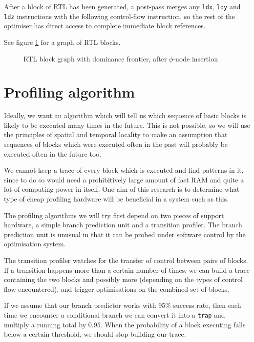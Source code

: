 After a block of RTL has been generated, a post-pass merges any \texttt{ldx}, \texttt{ldy} and \texttt{ldz} instructions with the following control-flow instruction, so the rest of the optimiser has direct access to complete immediate block references.

See figure \ref{rtl} for a graph of RTL blocks.

\begin{figure}[tmb]
\centerline{}
\caption{\label{rtl}RTL block graph with dominance frontier, after $\phi$-node insertion}
\end{figure}

\section{Profiling algorithm}

Ideally, we want an algorithm which will tell us which sequence of basic blocks is likely to be executed many times in the future. This is not possible, so we will use the principles of spatial and temporal locality to make an assumption that sequences of blocks which were executed often in the past will probably be executed often in the future too.

We cannot keep a trace of every block which is executed and find patterns in it, since to do so would need a prohibitively large amount of fast RAM and quite a lot of computing power in itself. One aim of this research is to determine what type of cheap profiling hardware will be beneficial in a system such as this.

The profiling algorithms we will try first depend on two pieces of support hardware, a simple branch prediction unit and a transition profiler. The branch prediction unit is unusual in that it can be probed under software control by the optimisation system.

The transition profiler watches for the transfer of control between pairs of blocks. If a transition happens more than a certain number of times, we can build a trace containing the two blocks and possibly more (depending on the types of control flow encountered), and trigger optimisations on the combined set of blocks.

If we assume that our branch predictor works with 95\% success rate, then each time we encounter a conditional branch we can convert it into a \texttt{trap} and multiply a running total by 0.95. When the probability of a block executing falls below a certain threshold, we should stop building our trace.

